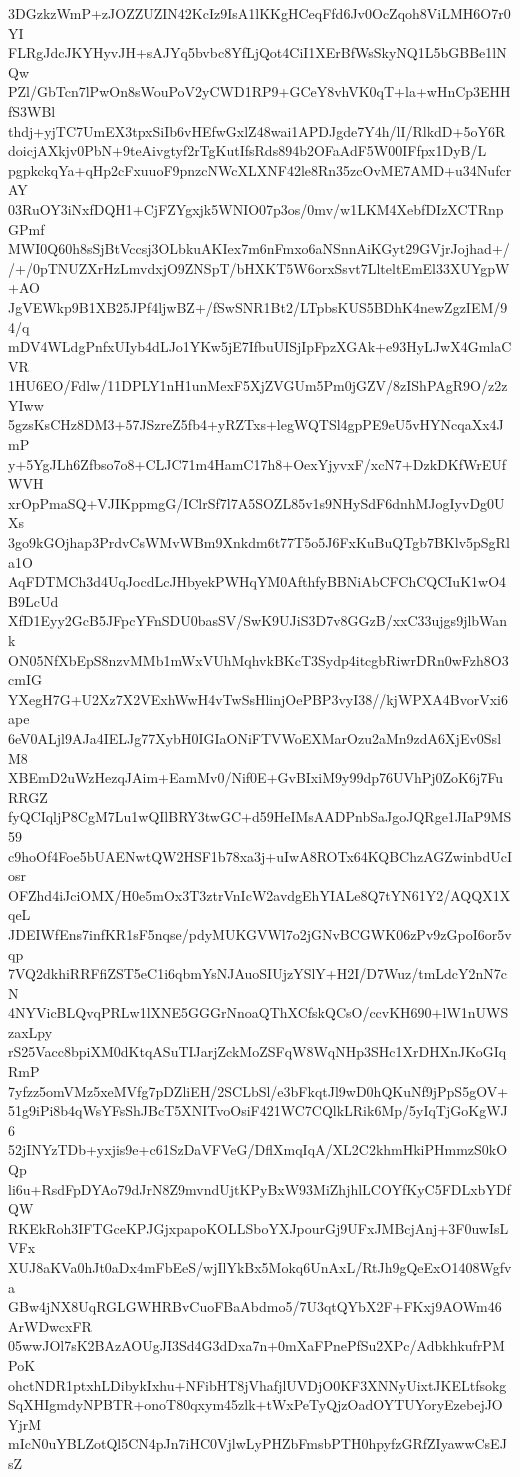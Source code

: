 3DGzkzWmP+zJOZZUZIN42KcIz9IsA1lKKgHCeqFfd6Jv0OcZqoh8ViLMH6O7r0YI
FLRgJdcJKYHyvJH+sAJYq5bvbc8YfLjQot4CiI1XErBfWsSkyNQ1L5bGBBe1lNQw
PZl/GbTcn7lPwOn8sWouPoV2yCWD1RP9+GCeY8vhVK0qT+la+wHnCp3EHHfS3WBl
thdj+yjTC7UmEX3tpxSiIb6vHEfwGxlZ48wai1APDJgde7Y4h/lI/RlkdD+5oY6R
doicjAXkjv0PbN+9teAivgtyf2rTgKutIfsRds894b2OFaAdF5W00IFfpx1DyB/L
pgpkckqYa+qHp2cFxuuoF9pnzcNWcXLXNF42le8Rn35zcOvME7AMD+u34NufcrAY
03RuOY3iNxfDQH1+CjFZYgxjk5WNIO07p3os/0mv/w1LKM4XebfDIzXCTRnpGPmf
MWI0Q60h8sSjBtVccsj3OLbkuAKIex7m6nFmxo6aNSnnAiKGyt29GVjrJojhad+/
/+/0pTNUZXrHzLmvdxjO9ZNSpT/bHXKT5W6orxSsvt7LlteltEmEl33XUYgpW+AO
JgVEWkp9B1XB25JPf4ljwBZ+/fSwSNR1Bt2/LTpbsKUS5BDhK4newZgzIEM/94/q
mDV4WLdgPnfxUIyb4dLJo1YKw5jE7IfbuUISjIpFpzXGAk+e93HyLJwX4GmlaCVR
1HU6EO/Fdlw/11DPLY1nH1unMexF5XjZVGUm5Pm0jGZV/8zIShPAgR9O/z2zYIww
5gzsKsCHz8DM3+57JSzreZ5fb4+yRZTxs+legWQTSl4gpPE9eU5vHYNcqaXx4JmP
y+5YgJLh6Zfbso7o8+CLJC71m4HamC17h8+OexYjyvxF/xcN7+DzkDKfWrEUfWVH
xrOpPmaSQ+VJIKppmgG/IClrSf7l7A5SOZL85v1s9NHySdF6dnhMJogIyvDg0UXs
3go9kGOjhap3PrdvCsWMvWBm9Xnkdm6t77T5o5J6FxKuBuQTgb7BKlv5pSgRla1O
AqFDTMCh3d4UqJocdLcJHbyekPWHqYM0AfthfyBBNiAbCFChCQCIuK1wO4B9LcUd
XfD1Eyy2GcB5JFpcYFnSDU0basSV/SwK9UJiS3D7v8GGzB/xxC33ujgs9jlbWank
ON05NfXbEpS8nzvMMb1mWxVUhMqhvkBKcT3Sydp4itcgbRiwrDRn0wFzh8O3cmIG
YXegH7G+U2Xz7X2VExhWwH4vTwSsHlinjOePBP3vyI38//kjWPXA4BvorVxi6ape
6eV0ALjl9AJa4IELJg77XybH0IGIaONiFTVWoEXMarOzu2aMn9zdA6XjEv0SslM8
XBEmD2uWzHezqJAim+EamMv0/Nif0E+GvBIxiM9y99dp76UVhPj0ZoK6j7FuRRGZ
fyQCIqljP8CgM7Lu1wQIlBRY3twGC+d59HeIMsAADPnbSaJgoJQRge1JIaP9MS59
c9hoOf4Foe5bUAENwtQW2HSF1b78xa3j+uIwA8ROTx64KQBChzAGZwinbdUcIosr
OFZhd4iJciOMX/H0e5mOx3T3ztrVnIcW2avdgEhYIALe8Q7tYN61Y2/AQQX1XqeL
JDEIWfEns7infKR1sF5nqse/pdyMUKGVWl7o2jGNvBCGWK06zPv9zGpoI6or5vqp
7VQ2dkhiRRFfiZST5eC1i6qbmYsNJAuoSIUjzYSlY+H2I/D7Wuz/tmLdcY2nN7cN
4NYVicBLQvqPRLw1lXNE5GGGrNnoaQThXCfskQCsO/ccvKH690+lW1nUWSzaxLpy
rS25Vacc8bpiXM0dKtqASuTIJarjZckMoZSFqW8WqNHp3SHc1XrDHXnJKoGIqRmP
7yfzz5omVMz5xeMVfg7pDZliEH/2SCLbSl/e3bFkqtJl9wD0hQKuNf9jPpS5gOV+
51g9iPi8b4qWsYFsShJBcT5XNITvoOsiF421WC7CQlkLRik6Mp/5yIqTjGoKgWJ6
52jINYzTDb+yxjis9e+c61SzDaVFVeG/DflXmqIqA/XL2C2khmHkiPHmmzS0kOQp
li6u+RsdFpDYAo79dJrN8Z9mvndUjtKPyBxW93MiZhjhlLCOYfKyC5FDLxbYDfQW
RKEkRoh3IFTGceKPJGjxpapoKOLLSboYXJpourGj9UFxJMBcjAnj+3F0uwIsLVFx
XUJ8aKVa0hJt0aDx4mFbEeS/wjIlYkBx5Mokq6UnAxL/RtJh9gQeExO1408Wgfva
GBw4jNX8UqRGLGWHRBvCuoFBaAbdmo5/7U3qtQYbX2F+FKxj9AOWm46ArWDwcxFR
05wwJOl7sK2BAzAOUgJI3Sd4G3dDxa7n+0mXaFPnePfSu2XPc/AdbkhkufrPMPoK
ohctNDR1ptxhLDibykIxhu+NFibHT8jVhafjlUVDjO0KF3XNNyUixtJKELtfsokg
SqXHIgmdyNPBTR+onoT80qxym45zlk+tWxPeTyQjzOadOYTUYoryEzebejJOYjrM
mIcN0uYBLZotQl5CN4pJn7iHC0VjlwLyPHZbFmsbPTH0hpyfzGRfZIyawwCsEJsZ
